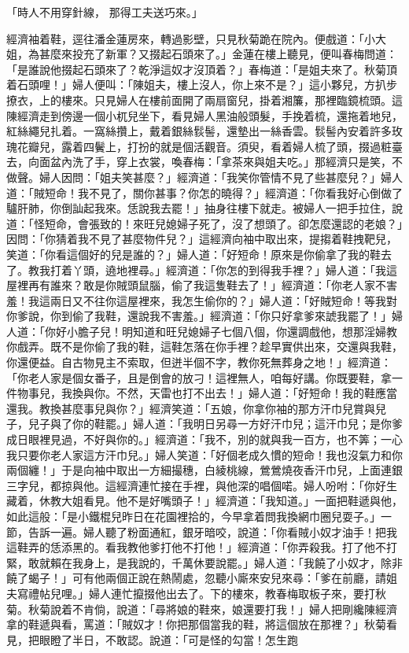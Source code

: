 \begin{showcontents}{}
「時人不用穿針線，  那得工夫送巧來。」

經濟袖着鞋，逕往潘金蓮房來，轉過影壁，只見秋菊跪在院內。便戲道：「小大姐，為甚麼來投充了新軍？又掇起石頭來了。」金蓮在樓上聽見，便叫春梅問道：「是誰說他掇起石頭來了？乾淨這奴才沒頂着？」春梅道：「是姐夫來了。秋菊頂着石頭哩！」婦人便叫：「陳姐夫，樓上沒人，你上來不是？」這小夥兒，方扒步撩衣，上的樓來。只見婦人在樓前面開了兩扇窗兒，掛着湘簾，那裡臨鏡梳頭。這陳經濟走到傍邊一個小杌兒坐下，看見婦人黑油般頭髮，手挽着梳，還拖着地兒，紅絲繩兒扎着。一窩絲攢上，戴着銀絲䯼髻，還墊出一絲香雲。䯼髻內安着許多玫瑰花瓣兒，露着四鬢上，打扮的就是個活觀音。須臾，看着婦人梳了頭，掇過粧臺去，向面盆內洗了手，穿上衣裳，喚春梅：「拿茶來與姐夫吃。」那經濟只是笑，不做聲。婦人因問：「姐夫笑甚麼？」經濟道：「我笑你管情不見了些甚麼兒？」婦人道：「賊短命！我不見了，關你甚事？你怎的曉得？」經濟道：「你看我好心倒做了驢肝肺，你倒訕起我來。恁說我去罷！」抽身往樓下就走。被婦人一把手拉住，說道：「怪短命，會張致的！來旺兒媳婦子死了，沒了想頭了。卻怎麼還認的老娘？」因問：「你猜着我不見了甚麼物件兒？」這經濟向袖中取出來，提搊着鞋拽靶兒，笑道：「你看這個好的兒是誰的？」婦人道：「好短命！原來是你偷拿了我的鞋去了。教我打着丫頭，遶地裡尋。」經濟道：「你怎的到得我手裡？」婦人道：「我這屋裡再有誰來？敢是你賊頭鼠腦，偷了我這隻鞋去了！」經濟道：「你老人家不害羞！我這兩日又不往你這屋裡來，我怎生偷你的？」婦人道：「好賊短命！等我對你爹說，你到偷了我鞋，還說我不害羞。」經濟道：「你只好拿爹來諕我罷了！」婦人道：「你好小膽子兒！明知道和旺兒媳婦子七個八個，你還調戲他，想那淫婦教你戲弄。既不是你偷了我的鞋，這鞋怎落在你手裡？趁早實供出來，交還與我鞋，你還便益。自古物見主不索取，但迸半個不字，教你死無葬身之地！」經濟道：「你老人家是個女番子，且是倒會的放刁！這裡無人，咱每好講。你既要鞋，拿一件物事兒，我換與你。不然，天雷也打不出去！」婦人道：「好短命！我的鞋應當還我。教換甚麼事兒與你？」經濟笑道：「五娘，你拿你袖的那方汗巾兒賞與兒子，兒子與了你的鞋罷。」婦人道：「我明日另尋一方好汗巾兒；這汗巾兒；是你爹成日眼裡見過，不好與你的。」經濟道：「我不，別的就與我一百方，也不筭；一心我只要你老人家這方汗巾兒。」婦人笑道：「好個老成久慣的短命！我也沒氣力和你兩個纏！」于是向袖中取出一方細撮穗，白綾桃線，鶯鶯燒夜香汗巾兒，上面連銀三字兒，都掠與他。這經濟連忙接在手裡，與他深的唱個喏。婦人吩咐：「你好生藏着，休教大姐看見。他不是好嘴頭子！」經濟道：「我知道。」一面把鞋遞與他，如此這般：「是小鐵棍兒昨日在花園裡拾的，今早拿着問我換網巾圈兒耍子。」一節，告訴一遍。婦人聽了粉面通紅，銀牙暗咬，說道：「你看賊小奴才油手！把我這鞋弄的恁添黑的。看我教他爹打他不打他！」經濟道：「你弄殺我。打了他不打緊，敢就賴在我身上，是我說的，千萬休要說罷。」婦人道：「我饒了小奴才，除非饒了蝎子！」可有他兩個正說在熱鬧處，忽聽小廝來安兒來尋：「爹在前廳，請姐夫寫禮帖兒哩。」婦人連忙攛掇他出去了。下的樓來，教春梅取板子來，要打秋菊。秋菊說着不肯倘，說道：「尋將娘的鞋來，娘還要打我！」婦人把剛纔陳經濟拿的鞋遞與看，罵道：「賊奴才！你把那個當我的鞋，將這個放在那裡？」秋菊看見，把眼瞪了半日，不敢認。說道：「可是怪的勾當！怎生跑
\end{showcontents}
